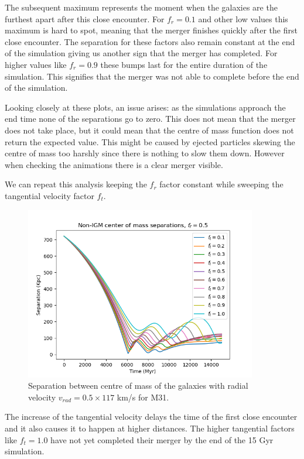 \documentclass[a4paper,12pt, english]{article}
\begin{document}
\smallskip
The subsequent maximum represents the moment when the galaxies are the furthest apart after this close encounter. For $f_r=0.1$ and other low values this maximum is hard to spot, meaning that the merger finishes quickly after the first close encounter. The separation for these factors also remain constant at the end of the simulation giving us another sign that the merger has completed. For higher values like $f_r=0.9$ these bumps last for the entire duration of the simulation. This signifies that the merger was not able to complete before the end of the simulation.\par
\smallskip
Looking closely at these plots, an issue arises: as the simulations approach the end time none of the separations go to zero. This does not mean that the merger does not take place, but it could mean that the centre of mass function does not return the expected value. This might be caused by ejected particles skewing the centre of mass too harshly since there is nothing to slow them down. However when checking the animations there is a clear merger visible.\par
\smallskip
We can repeat this analysis keeping the $f_r$ factor constant while sweeping the tangential velocity factor $f_t$.\par
\begin{figure}[!h]
    \centering
    \includegraphics[width=0.9\textwidth]{separation/comparison_constant_radvel_noIGM.png}
    \caption{Separation between centre of mass of the galaxies with radial velocity $v_{rad}=0.5 \times 117$ km/s for M31.}
    \label{fig:No-IGM-Separation-Radial-constant}
\end{figure}
\smallskip
The increase of the tangential velocity delays the time of the first close encounter and it also causes it to happen at higher distances. The higher tangential factors like $f_t=1.0$ have not yet completed their merger by the end of the 15 Gyr simulation.\par
\end{document}
